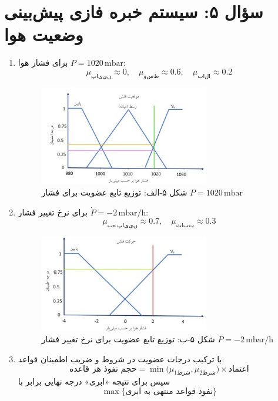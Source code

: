\documentclass[12pt,a4paper]{article}
\begin{document}
	\section*{سؤال ۵: سیستم خبره فازی پیش‌بینی وضعیت هوا}
	\begin{enumerate}[label=\alph*)]
		\item برای فشار هوا \(P=1020\,\mathrm{mbar}\):
		\[
		\mu_{\mathrm{پایین}}\approx0,\quad
		\mu_{\mathrm{وسط}}\approx0.6,\quad
		\mu_{\mathrm{بالا}}\approx0.2
		\]
		\FloatBarrier 
		\begin{figure}[H]
			\centering
			\includegraphics[width=0.7\textwidth]{5a.jpg}
			\caption*{شکل ۵-الف: توزیع تابع عضویت برای فشار \(P=1020\,\mathrm{mbar}\)}
		\end{figure}
		\item برای نرخ تغییر فشار \(\dot P=-2\,\mathrm{mbar/h}\):
		\[
		\mu_{\mathrm{به\ پایین}}\approx0.7,\quad
		\mu_{\mathrm{ثابت}}\approx0.3
		\]
		\FloatBarrier 
		\begin{figure}[H]
			\centering
			\includegraphics[width=0.7\textwidth]{5b.jpg}
			\caption*{شکل ۵-ب: توزیع تابع عضویت برای نرخ تغییر فشار \(\dot P=-2\,\mathrm{mbar/h}\)}
		\end{figure}
		\item با ترکیب درجات عضویت در شروط و ضریب اطمینان قواعد:
		\[
		\text{حجم نفوذ هر قاعده} = \min\bigl(\mu_{\text{شرط1}},\mu_{\text{شرط2}}\bigr)\times\text{اعتماد}
		\]
		سپس برای نتیجه «ابری» درجه نهایی برابر با
		\[
		\max\{\text{نفوذ قواعد منتهی به ابری}\}
		\]
	\end{enumerate}
	
\end{document}
